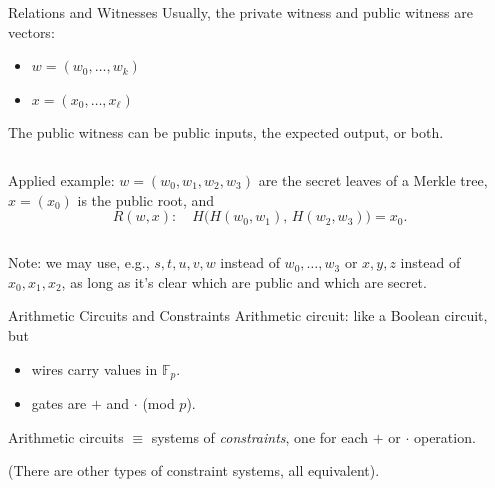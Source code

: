 \documentclass[aspectratio=169,11pt]{beamer}
\begin{document}
\begin{frame}{Relations and Witnesses}
Usually, the private witness and public witness are vectors:
\begin{itemize}
\item $w = (w_0, \ldots, w_k)$
\item $x = (x_0, \ldots, x_\ell)$
\end{itemize}
\pause

The public witness can be public inputs, the expected output, or both.
\pause

\begin{columns}[c]
Applied example: $w = (w_0, w_1, w_2, w_3)$ are the secret leaves of a Merkle tree, $x = (x_0)$ is the public root, and
\[R(w, x):\quad H\bigl(H(w_0, w_1),\, H(w_2, w_3)\bigr) = x_0.\]
\centering
{}
\end{columns}
\pause

Note: we may use, e.g., $s, t, u, v, w$ instead of $w_0, \ldots, w_3$ or $x, y, z$ instead of $x_0, x_1, x_2$, as long as it's clear which are public and which are secret.
\end{frame}

\begin{frame}{Arithmetic Circuits and Constraints}
Arithmetic circuit: like a Boolean circuit, but
\begin{itemize}
\item wires carry values in $\mathbb F_p$.
\item gates are $+$ and $\cdot$ (mod $p$).
\end{itemize}

\pause

Arithmetic circuits $\equiv$ systems of \emph{constraints}, one for each $+$ or $\cdot$ operation. 

(There are other types of constraint systems, all equivalent).

\end{frame}
\end{document}
